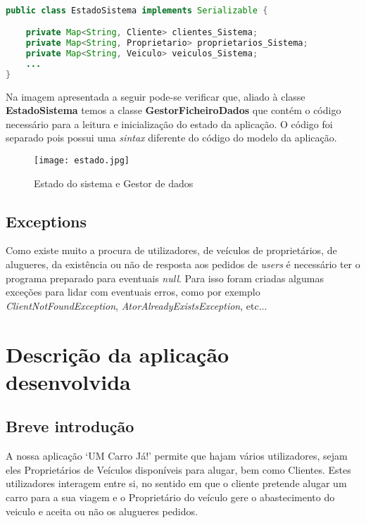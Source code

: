 \documentclass[a4paper,11pt]{report}
\begin{document}
\begin{lstlisting}[language=java]

public class EstadoSistema implements Serializable {

    private Map<String, Cliente> clientes_Sistema;
    private Map<String, Proprietario> proprietarios_Sistema;
    private Map<String, Veiculo> veiculos_Sistema;
    ...
}
\end{lstlisting}
 
Na imagem apresentada a seguir pode-se verificar que, aliado à classe \textbf{EstadoSistema} temos a classe \textbf{GestorFicheiroDados} que contém o código necessário para a leitura e inicialização do estado da aplicação. O código foi separado pois possui uma \textit{sintax} diferente do código do modelo da aplicação.
 
   \begin{figure}[H]
    \vspace{0.5cm}
        \centering
        \texttt{[image: estado.jpg]}
        \label{img:logo}
        \caption{Estado do sistema e Gestor de dados}
    \end{figure}

\section{Exceptions}

\hspace{0.5cm}Como existe muito a procura de utilizadores, de veículos de proprietários, de alugueres, da existência ou não de resposta aos pedidos de \textit{users} é necessário ter o programa preparado para eventuais \textit{null}.
Para isso foram criadas algumas exceções para lidar com eventuais erros, como por exemplo \textit{ClientNotFoundException},  \textit{AtorAlreadyExistsException}, etc...

\chapter{Descrição da aplicação desenvolvida}

\section{Breve introdução}

\hspace{0.50cm} A nossa aplicação ‘UM Carro Já!’ permite que hajam vários utilizadores, sejam eles Proprietários de Veículos disponíveis para alugar, bem como Clientes. Estes utilizadores interagem entre si, no sentido em que o cliente pretende alugar um carro para a sua viagem e o Proprietário do veículo gere o abastecimento do veiculo e aceita ou não os alugueres pedidos.
\end{document}
